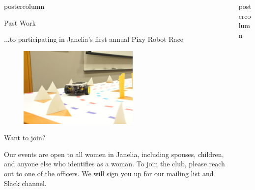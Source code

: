 \documentclass{beamer}
\newlength{\columnheight}
\begin{document}
\begin{frame}
\begin{columns}
\begin{column}{.33\textwidth}
\begin{beamercolorbox}[center,wd=\textwidth]{postercolumn}
\begin{minipage}[T]{.95\textwidth}
{\begin{myblock}{Past Work}
                        \begin{addmargin}[1em]{1em}
                            ...to participating in Janelia's first annual Pixy Robot Race
                        \end{addmargin}
                        \begin{addmargin}[1em]{1em}
                            \begin{figure}
                                \vspace{.5cm}
                                \centering\includegraphics[width=0.59\textwidth]{img/robot.jpg}
                                \vspace{.5cm}
                            \end{figure}
                        \end{addmargin}
                    \end{myblock}
                    \vspace{1cm}
                    \begin{myblock}{Want to join?}
                        \begin{addmargin}[1em]{1em}
                            Our events are open to all women in Janelia, including spouses, children, and anyone else who identifies as a woman. To join the club, please reach out to one of the officers. We will sign you up for our mailing list and Slack channel.
                        \end{addmargin}
                    \end{myblock}}
		        \end{minipage}\end{beamercolorbox}
  \end{column}
	\begin{column}{.33\textwidth}
		\begin{beamercolorbox}[center,wd=\textwidth]{postercolumn}
			\begin{minipage}[T]{.95\textwidth}
				\parbox[t][\columnheight]{\textwidth}{
}
\end{minipage}
\end{beamercolorbox}
\end{column}
\end{columns}
\end{frame}
\end{document}
